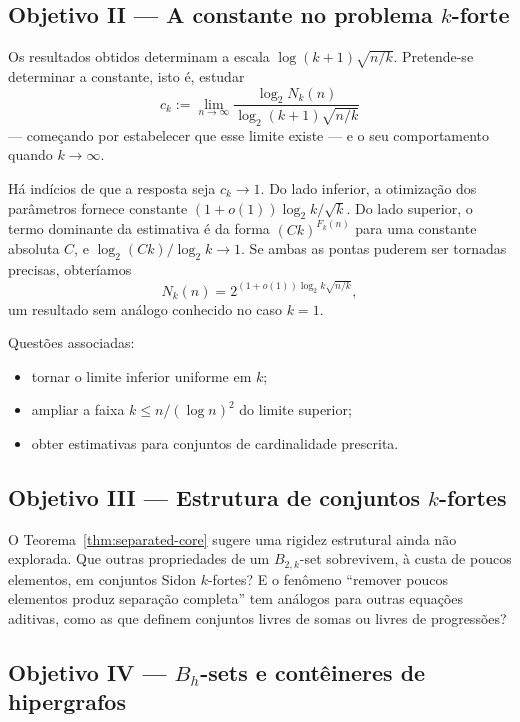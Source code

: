 \documentclass[11pt,a4paper]{article}
\theoremstyle{definition}
\theoremstyle{remark}
\begin{document}
\subsection{Objetivo II --- A constante no problema \texorpdfstring{\(k\)}{k}-forte}

Os resultados obtidos determinam a escala \(\log(k+1)\sqrt{n/k}\).
Pretende-se determinar a constante, isto é, estudar
\[
  c_k
  :=
  \lim_{n\to\infty}
  \frac{\log_2 N_k(n)}{\log_2(k+1)\sqrt{n/k}}
\]
--- começando por estabelecer que esse limite existe --- e o seu
comportamento quando \(k\to\infty\).

Há indícios de que a resposta seja \(c_k\to1\). Do lado inferior, a
otimização dos parâmetros fornece constante \((1+o(1))\log_2k/\sqrt k\).
Do lado superior, o termo dominante da estimativa é da forma
\((Ck)^{F_k(n)}\) para uma constante absoluta \(C\), e
\(\log_2(Ck)/\log_2k\to1\). Se ambas as pontas puderem ser tornadas
precisas, obteríamos
\[
  N_k(n)=2^{(1+o(1))\log_2k\sqrt{n/k}},
\]
um resultado sem análogo conhecido no caso \(k=1\).

Questões associadas:
\begin{itemize}
  \item tornar o limite inferior uniforme em \(k\);
  \item ampliar a faixa \(k\leq n/(\log n)^2\) do limite superior;
  \item obter estimativas para conjuntos de cardinalidade prescrita.
\end{itemize}

\subsection{Objetivo III --- Estrutura de conjuntos \texorpdfstring{\(k\)}{k}-fortes}

O Teorema~\ref{thm:separated-core} sugere uma rigidez estrutural ainda
não explorada. Que outras propriedades de um \(B_{2,k}\)-set
sobrevivem, à custa de poucos elementos, em conjuntos Sidon
\(k\)-fortes? E o fenômeno ``remover poucos elementos produz separação
completa'' tem análogos para outras equações aditivas, como as que
definem conjuntos livres de somas ou livres de progressões?

\subsection{Objetivo IV --- \texorpdfstring{\(B_h\)}{Bh}-sets e contêineres de hipergrafos}
\end{document}
